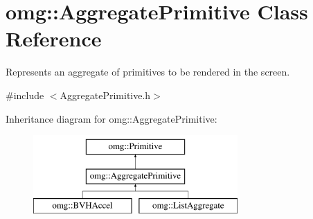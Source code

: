\hypertarget{classomg_1_1_aggregate_primitive}{}\section{omg\+::Aggregate\+Primitive Class Reference}
\label{classomg_1_1_aggregate_primitive}


Represents an aggregate of primitives to be rendered in the screen.  




{\ttfamily \#include $<$Aggregate\+Primitive.\+h$>$}

Inheritance diagram for omg\+::Aggregate\+Primitive\+:\begin{figure}[H]
\begin{center}
\leavevmode
\includegraphics[height=3.000000cm]{classomg_1_1_aggregate_primitive}
\end{center}
\end{figure}
